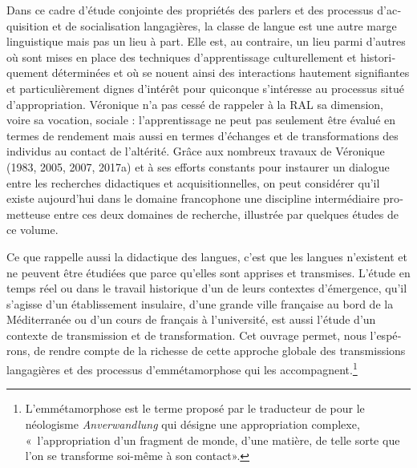 \documentclass[output=paper]{langscibook}
\begin{document}
\begin{otherlanguage}{french}
Dans ce cadre d’étude conjointe des propriétés des parlers et des processus d’acquisition et de socialisation langagières, la classe de langue est une autre marge linguistique mais pas un lieu à part. Elle est, au contraire, un lieu parmi d’autres où sont mises en place des techniques d’apprentissage culturellement et historiquement déterminées et où se nouent ainsi des interactions hautement signifiantes et particulièrement dignes d’intérêt pour quiconque s’intéresse au processus situé d’appropriation. Véronique n’a pas cessé de rappeler à la RAL sa dimension, voire sa vocation, sociale : l’apprentissage ne peut pas seulement être évalué en termes de rendement mais aussi en termes d’échanges et de transformations des individus au contact de l’altérité. Grâce aux nombreux travaux de Véronique (1983, 2005, 2007, 2017a) et à ses efforts constants pour instaurer un dialogue entre les recherches didactiques et acquisitionnelles, on peut considérer qu’il existe aujourd’hui dans le domaine francophone une discipline intermédiaire prometteuse entre ces deux domaines de recherche, illustrée par quelques études de ce volume.

Ce que rappelle aussi la didactique des langues, c’est que les langues n’existent et ne peuvent être étudiées que parce qu’elles sont apprises et transmises. L’étude en temps réel ou dans le travail historique d’un de leurs contextes d’émergence, qu’il s’agisse d’un établissement insulaire, d’une grande ville française au bord de la Méditerranée ou d’un cours de français à l’université, est aussi l’étude d’un contexte de transmission et de transformation. Cet ouvrage permet, nous l’espérons, de rendre compte de la richesse de cette approche globale des transmissions langagières et des processus d’emmétamorphose qui les accompagnent.\footnote{L’emmétamorphose est le terme proposé par le traducteur de \citet{Rosa2022} pour le néologisme \textit{Anverwandlung} qui désigne une appropriation complexe, «~l'appropriation d'un fragment de monde, d'une matière, de telle sorte que l'on se transforme soi-même à son contact».} 


\end{otherlanguage}
\end{document}
